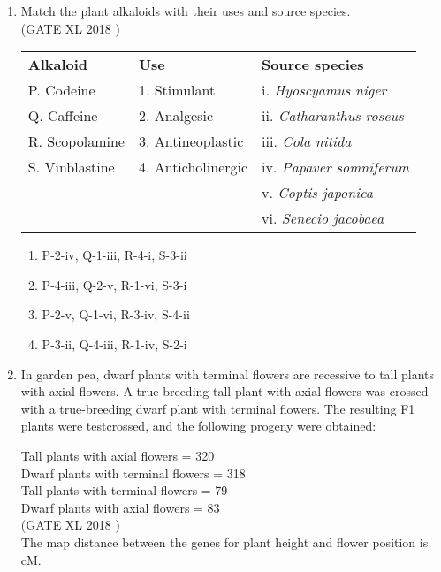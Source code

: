 \documentclass[14pt]{extarticle}
\begin{document}
\begin{flushleft}
\begin{enumerate}[leftmargin=*]
\item Match the plant alkaloids with their uses and source species.\\
\hfill(GATE XL 2018 )
\begin{tabular}{p{3cm} p{4cm} p{6cm}}
\textbf{Alkaloid} & \textbf{Use} & \textbf{Source species} \\
P. Codeine & 1. Stimulant & i. \textit{Hyoscyamus niger} \\
Q. Caffeine & 2. Analgesic & ii. \textit{Catharanthus roseus} \\
R. Scopolamine & 3. Antineoplastic & iii. \textit{Cola nitida} \\
S. Vinblastine & 4. Anticholinergic & iv. \textit{Papaver somniferum} \\
 & & v. \textit{Coptis japonica} \\
 & & vi. \textit{Senecio jacobaea} \\
\end{tabular}

\begin{enumerate}
    \item P-2-iv, Q-1-iii, R-4-i, S-3-ii
    \item P-4-iii, Q-2-v, R-1-vi, S-3-i
    \item P-2-v, Q-1-vi, R-3-iv, S-4-ii
    \item P-3-ii, Q-4-iii, R-1-iv, S-2-i
\end{enumerate}

    \item In garden pea, dwarf plants with terminal flowers are recessive to tall plants with axial flowers. A true-breeding tall plant with axial flowers was crossed with a true-breeding dwarf plant with terminal flowers. The resulting F1 plants were testcrossed, and the following progeny were obtained:  

    Tall plants with axial flowers = 320 \\
    Dwarf plants with terminal flowers = 318 \\
    Tall plants with terminal flowers = 79 \\
    Dwarf plants with axial flowers = 83  \\
    \hfill(GATE XL 2018 )\\
    The map distance between the genes for plant height and flower position is \underline{\hspace{3cm}} cM.


\end{enumerate}
\end{flushleft}
\end{document}
